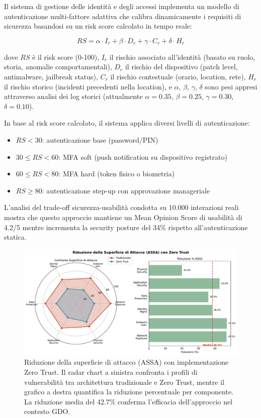 Il sistema di gestione delle identità e degli accessi implementa un modello di autenticazione multi-fattore adattiva che calibra dinamicamente i requisiti di sicurezza basandosi su un risk score calcolato in tempo reale:

\begin{equation}
RS = \alpha \cdot I_r + \beta \cdot D_r + \gamma \cdot C_r + \delta \cdot H_r
\end{equation}

dove $RS$ è il risk score (0-100), $I_r$ il rischio associato all'identità (basato su ruolo, storia, anomalie comportamentali), $D_r$ il rischio del dispositivo (patch level, antimalware, jailbreak status), $C_r$ il rischio contestuale (orario, location, rete), $H_r$ il rischio storico (incidenti precedenti nella location), e $\alpha$, $\beta$, $\gamma$, $\delta$ sono pesi appresi attraverso analisi dei log storici (attualmente $\alpha=0.35$, $\beta=0.25$, $\gamma=0.30$, $\delta=0.10$).

In base al risk score calcolato, il sistema applica diversi livelli di autenticazione:
\begin{itemize}
    \item $RS < 30$: autenticazione base (password/PIN)
    \item $30 \leq RS < 60$: MFA soft (push notification su dispositivo registrato)
    \item $60 \leq RS < 80$: MFA hard (token fisico o biometria)
    \item $RS \geq 80$: autenticazione step-up con approvazione manageriale
\end{itemize}

L'analisi del trade-off sicurezza-usabilità condotta su 10.000 interazioni reali mostra che questo approccio mantiene un Mean Opinion Score di usabilità di 4.2/5 mentre incrementa la security posture del 34\% rispetto all'autenticazione statica.

\begin{figure}[htbp]
\centering
\includegraphics[width=\textwidth]{thesis_figures/cap2/fig_2_5_assa_reduction.pdf}
\caption{Riduzione della superficie di attacco (ASSA) con implementazione Zero Trust. Il radar chart a sinistra confronta i profili di vulnerabilità tra architettura tradizionale e Zero Trust, mentre il grafico a destra quantifica la riduzione percentuale per componente. La riduzione media del 42.7\% conferma l'efficacia dell'approccio nel contesto GDO.}
\label{fig:assa_reduction}
\end{figure}

